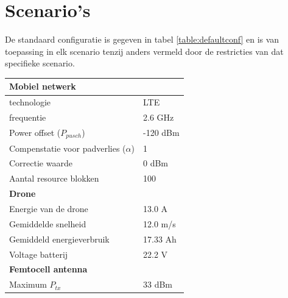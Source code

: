 \documentclass[twocolumn]{phdsymp_dutch}
\begin{document}

\section{Scenario's}

De standaard configuratie is gegeven in tabel \ref{table:defaultconf} en is van toepassing 
in elk scenario tenzij anders vermeld door de restricties van dat specifieke scenario.

\begin{table}[!htb]
\centering
\begin{tabular}[t]{ll}
        \toprule
        \multicolumn{2}{l}{\textbf{Mobiel netwerk}} \\
        \hline
        \hspace{3mm}  technologie        & LTE     \\
        \hspace{3mm}  frequentie         & 2.6 GHz \\
        \hspace{3mm}  Power offset ($P_{pusch}$)            & -120 dBm  \\
        \hspace{3mm}  Compenstatie voor padverlies ($\alpha$)   & 1  \\
        \hspace{3mm}  Correctie waarde                    & 0 dBm  \\
        \hspace{3mm}  Aantal resource blokken      & 100  \\
        \hline
        \multicolumn{2}{l}{\textbf{Drone}} \\
        \hline  
        \hspace{3mm}  Energie van de drone        & 13.0 A   \\
        \hspace{3mm}  Gemiddelde snelheid        & 12.0 m/s \\
        \hspace{3mm}  Gemiddeld energieverbruik      & 17.33 Ah    \\
        \hspace{3mm}  Voltage batterij       & 22.2 V \\
        \hline
        \multicolumn{2}{l}{\textbf{Femtocell antenna}} \\
        \hline  
        \hspace{3mm}  Maximum $P_{tx}$          & 33 dBm   \\

\end{tabular}
\end{table}
\end{document}
